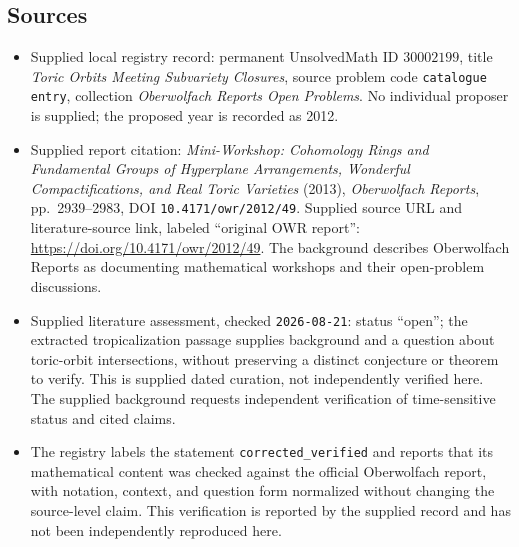\documentclass[11pt]{article}
\begin{document}
\subsection{Sources}
\begin{itemize}
\item Supplied local registry record: permanent UnsolvedMath ID \(30002199\), title \emph{Toric Orbits Meeting Subvariety Closures}, source problem code \texttt{catalogue entry}, collection \emph{Oberwolfach Reports Open Problems}. No individual proposer is supplied; the proposed year is recorded as 2012.
\item Supplied report citation: \emph{Mini-Workshop: Cohomology Rings and Fundamental Groups of Hyperplane Arrangements, Wonderful Compactifications, and Real Toric Varieties} (2013), \emph{Oberwolfach Reports}, pp.~2939--2983, DOI \texttt{10.4171/owr/2012/49}. Supplied source URL and literature-source link, labeled ``original OWR report'': \url{https://doi.org/10.4171/owr/2012/49}. The background describes Oberwolfach Reports as documenting mathematical workshops and their open-problem discussions.
\item Supplied literature assessment, checked \texttt{2026-08-21}: status ``open''; the extracted tropicalization passage supplies background and a question about toric-orbit intersections, without preserving a distinct conjecture or theorem to verify. This is supplied dated curation, not independently verified here. The supplied background requests independent verification of time-sensitive status and cited claims.
\item The registry labels the statement \texttt{corrected\_verified} and reports that its mathematical content was checked against the official Oberwolfach report, with notation, context, and question form normalized without changing the source-level claim. This verification is reported by the supplied record and has not been independently reproduced here.
\end{itemize}
\end{document}
